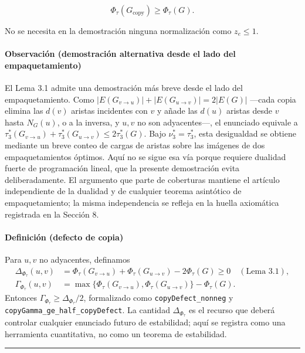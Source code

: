 \documentclass[
  spanish,
  11pt,
  a4paper,
]{article}
\begin{document}
\[
\Phi_\tau(G_{\mathrm{copy}})\ge\Phi_\tau(G).
\]

No se necesita en la demostración ninguna normalización como \(z_e\le1\).

\paragraph{Observación (demostración alternativa desde el lado del empaquetamiento)}\label{observaciuxf3n-demostraciuxf3n-alternativa-desde-el-lado-del-empaquetamiento}

El Lema 3.1 admite una demostración más breve desde el lado del empaquetamiento. Como \(|E(G_{v\to u})|+|E(G_{u\to v})|=2|E(G)|\) ---cada copia elimina las \(d(v)\) aristas incidentes con \(v\) y añade las \(d(u)\) aristas desde \(v\) hasta \(N_G(u)\), o a la inversa, y \(u,v\) no son adyacentes---, el enunciado equivale a \(\tau_3^*(G_{v\to u})+\tau_3^*(G_{u\to v})\le2\tau_3^*(G)\). Bajo \(\nu_3^*=\tau_3^*\), esta desigualdad se obtiene mediante un breve conteo de cargas de aristas sobre las imágenes de dos empaquetamientos óptimos. Aquí no se sigue esa vía porque requiere dualidad fuerte de programación lineal, que la presente demostración evita deliberadamente. El argumento que parte de coberturas mantiene el artículo independiente de la dualidad y de cualquier teorema asintótico de empaquetamiento; la misma independencia se refleja en la huella axiomática registrada en la Sección 8.

\paragraph{Definición (defecto de copia)}\label{definiciuxf3n-defecto-de-copia}

Para \(u,v\) no adyacentes, definamos
\[
\begin{aligned}
\Delta_{\Phi_\tau}(u,v)
&=\Phi_\tau(G_{v\to u})+\Phi_\tau(G_{u\to v})-2\Phi_\tau(G)\ge0
\quad(\text{Lema 3.1}),\\
\Gamma_{\Phi_\tau}(u,v)
&=\max\{\Phi_\tau(G_{v\to u}),\Phi_\tau(G_{u\to v})\}-\Phi_\tau(G).
\end{aligned}
\]
Entonces \(\Gamma_{\Phi_\tau}\ge\Delta_{\Phi_\tau}/2\), formalizado como \texttt{copyDefect\_nonneg} y \texttt{copyGamma\_ge\_half\_copyDefect}. La cantidad \(\Delta_{\Phi_\tau}\) es el recurso que deberá controlar cualquier enunciado futuro de estabilidad; aquí se registra como una herramienta cuantitativa, no como un teorema de estabilidad.

\begin{center}\rule{0.5\linewidth}{0.5pt}\end{center}
\end{document}
